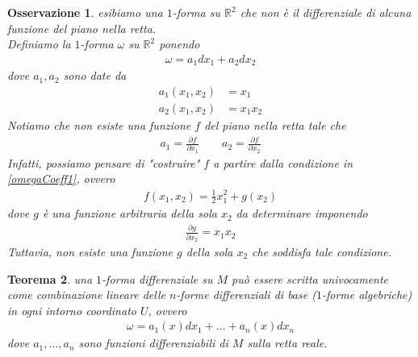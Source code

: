 \documentclass[twoside, 11pt]{amsbook}
\newcommand{\0}{{(0)}}
\newcommand{\3}{{(3)}}
\theoremstyle{colonplain}
\newtheorem{thm}{Teorema}[chapter]
\theoremstyle{colondefinition}
\theoremstyle{colonremark}
\newtheorem{rmk}[thm]{Osservazione}
\numberwithin{equation}{chapter}
\begin{document}
\begin{rmk} esibiamo una $1$-forma su $\mathbb{R}^2$ che non è il differenziale di alcuna funzione del piano nella retta. \\
Definiamo la $1$-forma $\omega$ su $\mathbb{R}^2$ ponendo
\begin{align}
    \omega = a_1dx_1 + a_2dx_2
\end{align}
dove $a_1, a_2$ sono date da 
\begin{align}\label{omegaCoeff1}
    a_1(x_1, x_2) &= x_1 \\
    a_2(x_1, x_2) &= x_1x_2
\end{align}
Notiamo che non esiste una funzione $f$ del piano nella retta tale che 
\begin{align}
    a_1 = \frac{\partial f}{\partial x_1} \qquad a_2 = \frac{\partial f}{\partial x_2}
\end{align}
Infatti, possiamo pensare di "costruire" $f$ a partire dalla condizione in \eqref{omegaCoeff1}, ovvero
\begin{align}
    f(x_1, x_2) = \frac{1}{2}x^2_1 + g(x_2)
\end{align}
dove $g$ è una funzione arbitraria della sola $x_2$ da determinare imponendo
\begin{align}
    \frac{\partial g}{\partial x_2} = x_1x_2
\end{align}
Tuttavia, non esiste una funzione $g$ della sola $x_2$ che soddisfa tale condizione.
\end{rmk}
\begin{thm}\label{LocalCoordDiffForm} una $1$-forma differenziale su $M$ può essere scritta univocamente come combinazione lineare delle $n$-forme differenziali di base ($1$-forme algebriche) in ogni intorno coordinato $U$, ovvero
\begin{align}
    \omega = a_1(x)dx_1 + \dots + a_n(x)dx_n
\end{align}
dove $a_1, \dots, a_n$ sono funzioni differenziabili di $M$ sulla retta reale.
\end{thm}
\end{document}
